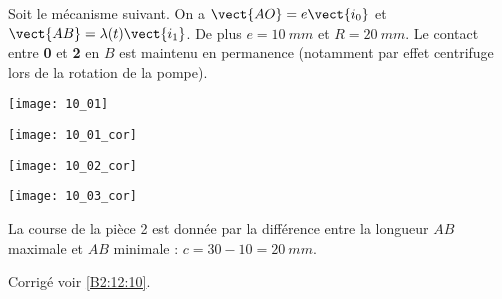 \normalfalse \difficiletrue \tdifficilefalse
\correctiontrue


\setcounter{question}{0}
\ifcorrection
\else
{}
\fi

\ifprof
\else
Soit le mécanisme suivant. On a $\vect{AO}=e\vect{i_0}$ et $\vect{AB}=\lambda(t)\vect{i_1}$. De plus $e=\SI{10}{mm}$ et $R=\SI{20}{mm}$. Le contact entre \textbf{0} et \textbf{2} en $B$ est maintenu en permanence (notamment par effet centrifuge lors de la rotation de la pompe).
\begin{center}
\texttt{[image: 10\_01]}
\end{center}
\fi


\ifprof
\begin{center}
\texttt{[image: 10\_01\_cor]}
\end{center}
\else
\fi


\ifprof
\begin{center}
\texttt{[image: 10\_02\_cor]}
\end{center}
\else
\fi

\ifprof
\begin{center}
\texttt{[image: 10\_03\_cor]}
\end{center}

\else
\fi


\ifprof
La course de la pièce 2 est donnée par la différence entre la longueur $AB$ maximale et $AB$ minimale : $c= 30-10 = \SI{20}{mm}$.
\else
\fi



\ifprof
\else
\begin{flushright}
\footnotesize{Corrigé  voir \ref{B2:12:10}.}
\end{flushright}%
\fi